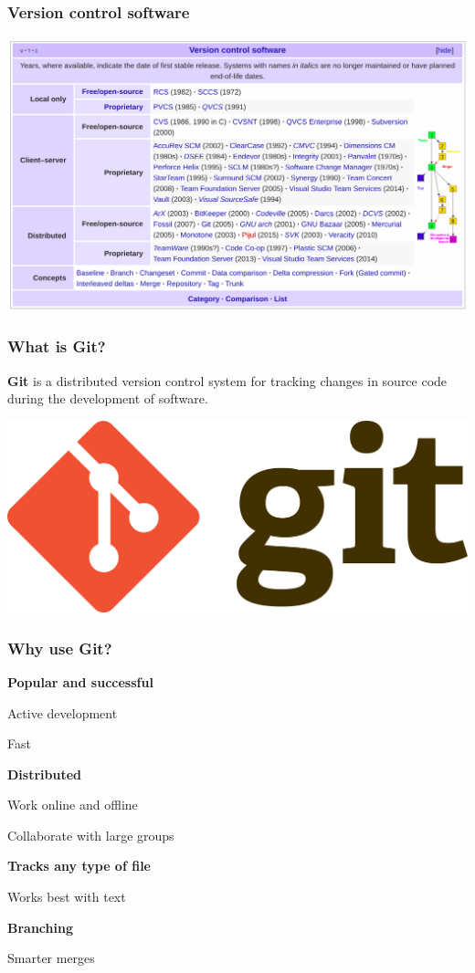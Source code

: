 \documentclass{beamer}
\newcommand{\SubItem}[1]{
    {\setlength\itemindent{15pt} \item[-] #1}
}
\begin{document}
\begin{frame}
\frametitle{Version control software}
\begin{center}
\includegraphics[scale=0.29]{img/controlVersion.png}
\end{center}
\end{frame}


\begin{frame}
\frametitle{What is Git?}

\textbf{Git} is a distributed version control system for tracking changes in source code during the development of software.

 \hfill \break

\begin{center}
\includegraphics[scale=0.07]{img/git_logo.png}
\end{center}
\end{frame}


\begin{frame}
\frametitle{Why use Git?}
\begin{itemize}
    \item \textbf{Popular and successful}
      \SubItem{Active development}
      \SubItem{Fast}
      \hfill \break
    \item \textbf{Distributed}
      \SubItem{Work online and offline}
      \SubItem{Collaborate with large groups}
      \hfill \break
    \item \textbf{Tracks any type of file}
      \SubItem{Works best with text}
      \hfill \break
    \item \textbf{Branching}
      \SubItem{Smarter merges}
\end{itemize}
\end{frame}
\end{document}
